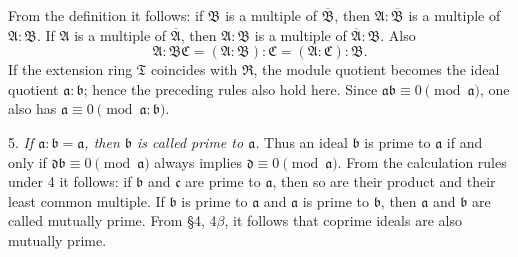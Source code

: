 \documentclass[11pt]{article}
\providecommand{\mR}{\mathfrak{R}}
\providecommand{\mT}{\mathfrak{T}}
\providecommand{\mA}{\mathfrak{A}}
\providecommand{\mB}{\mathfrak{B}}
\providecommand{\mC}{\mathfrak{C}}
\providecommand{\ma}{\mathfrak{a}}
\providecommand{\mb}{\mathfrak{b}}
\providecommand{\mc}{\mathfrak{c}}
\providecommand{\md}{\mathfrak{d}}
\begin{document}
From the definition it follows: if $\mB$ is a multiple of $\overline{\mB}$, then $\mA:\overline{\mB}$ is a multiple of $\mA:\mB$. If $\mA$ is a multiple of $\overline{\mA}$, then $\mA:\mB$ is a multiple of $\overline{\mA}:\mB$. Also
\[
        \mA:\mB\mC=(\mA:\mB):\mC=(\mA:\mC):\mB .
\]
If the extension ring $\mT$ coincides with $\mR$, the module quotient becomes the ideal quotient $\ma:\mb$; hence the preceding rules also hold here. Since $\ma\mb\equiv0\pmod{\ma}$, one also has $\ma\equiv0\pmod{\ma:\mb}$.

5. \emph{If $\ma:\mb=\ma$, then $\mb$ is called prime to $\ma$.} Thus an ideal $\mb$ is prime to $\ma$ if and only if $\md\mb\equiv0\pmod{\ma}$ always implies $\md\equiv0\pmod{\ma}$. From the calculation rules under 4 it follows: if $\mb$ and $\mc$ are prime to $\ma$, then so are their product and their least common multiple. If $\mb$ is prime to $\ma$ and $\ma$ is prime to $\mb$, then $\ma$ and $\mb$ are called mutually prime. From §4, 4$\beta$, it follows that coprime ideals are also mutually prime.
\end{document}
